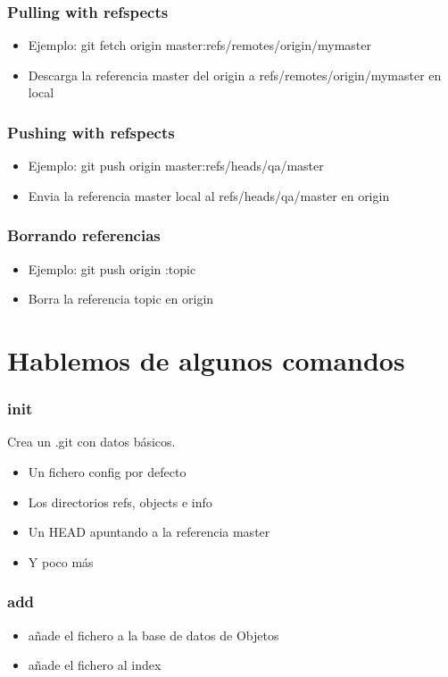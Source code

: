 \documentclass[10pt]{beamer}
\begin{document}
  \begin{frame}
    \frametitle{Pulling with refspects}
    \begin{itemize}
        \item Ejemplo: git fetch origin master:refs/remotes/origin/mymaster
        \item Descarga la referencia master del origin a refs/remotes/origin/mymaster en local
    \end{itemize}
  \end{frame}

  \begin{frame}
    \frametitle{Pushing with refspects}
    \begin{itemize}
        \item Ejemplo: git push origin master:refs/heads/qa/master
        \item Envia la referencia master local al refs/heads/qa/master en origin
    \end{itemize}
  \end{frame}

  \begin{frame}
    \frametitle{Borrando referencias}
    \begin{itemize}
        \item Ejemplo: git push origin :topic
        \item Borra la referencia topic en origin
    \end{itemize}
  \end{frame}

  \section*{Hablemos de algunos comandos}

  \begin{frame}
    \frametitle{init}
    Crea un .git con datos básicos.
    \begin{itemize}
      \item Un fichero config por defecto
      \item Los directorios refs, objects e info
      \item Un HEAD apuntando a la referencia master
      \item Y poco más
    \end{itemize}
  \end{frame}

  \begin{frame}
    \frametitle{add}
    \begin{itemize}
      \item añade el fichero a la base de datos de Objetos
      \item añade el fichero al index
    \end{itemize}
  \end{frame}
\end{document}
